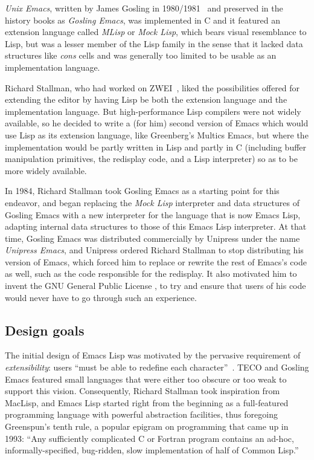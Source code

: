 \documentclass[format=acmsmall, review]{acmart}
\newcommand \Elisp {Emacs Lisp}
\begin{document}
\emph{Unix Emacs}, written by James Gosling in 1980/1981~\cite{Gosling1981}
and preserved in the history books as \emph{Gosling Emacs},
was implemented in C and it featured an extension
language called \emph{MLisp} or \emph{Mock Lisp}, which bears visual
resemblance to Lisp, but was a lesser member of the Lisp family in the
sense that it lacked data structures like \emph{cons} cells and was
generally too limited to be usable as an implementation language.

Richard Stallman, who had worked on
ZWEI~\cite{Stallman2018-personal}, liked the possibilities offered for
extending the editor by having Lisp be both the extension language and the
implementation language.  But high-performance Lisp compilers were not
widely available, so he decided to write a (for him) second version of Emacs
which would use Lisp as its extension language, like Greenberg's Multics
Emacs, but where the implementation would be partly written in Lisp and
partly in C (including buffer manipulation primitives, the redisplay code,
and a Lisp interpreter) so as to be more widely available.

In 1984, Richard Stallman took Gosling Emacs as a starting point for this
endeavor, and began replacing
the \emph{Mock Lisp} interpreter and data structures of Gosling Emacs
with a new interpreter for the language that is now \Elisp{}, adapting
internal data structures to those of
this \Elisp{} interpreter.  At that time, Gosling Emacs was distributed
commercially by Unipress under the name \emph{Unipress Emacs}, and Unipress
ordered Richard Stallman to stop distributing his version of Emacs, which
forced him to replace or rewrite the rest of Emacs's code as well, such as
the code responsible for the redisplay.  It also motivated him to invent the
GNU General Public License \cite{GPLHistory}, to try and ensure that users
of his code would never have to go through such an experience.

\subsection{Design goals}

The initial design of \Elisp{} was motivated by the pervasive requirement of
\emph{extensibility}: users ``must be able to redefine each
character''~\cite{Stallman1981}.  TECO and Gosling Emacs featured small
languages that were either too obscure or too weak to support this vision.
Consequently, Richard Stallman took inspiration from MacLisp, and \Elisp{}
started right from the beginning as a full-featured programming language with
powerful abstraction facilities, thus foregoing Greenspun's tenth
rule, a popular epigram on programming that came up in  1993: ``Any
sufficiently complicated C or Fortran program contains an
ad-hoc, informally-specified, bug-ridden, slow implementation of half of
Common Lisp.''~\cite{GreenspunsRule}
\end{document}
